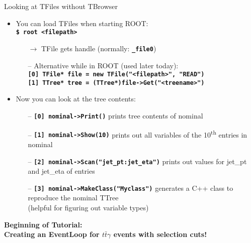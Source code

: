 \documentclass[10pt, aspectratio=169]{beamer}
\begin{document}
\begin{frame}{Looking at TFiles without TBrowser}
  \begin{itemize}
    \item
      You can load TFiles when starting ROOT: \\ \textbf{\texttt{\$ root <filepath>}}
    \begin{itemize}
      \item[$\rightarrow$] TFile gets handle (normally: \textbf{\texttt{\_file0}})
      \item[--] Alternative while in ROOT (used later today): \\ \textbf{\texttt{[0] TFile* file = new TFile("<filepath>", "READ")}} \\ \textbf{\texttt{[1] TTree* tree = (TTree*)file->Get("<treename>")}}
      
    \end{itemize}
    \item
      Now you can look at the tree contents:
    \begin{itemize}
      \item[--] \textbf{\texttt{[0] nominal->Print()}} prints tree contents of nominal
      \item[--] \textbf{\texttt{[1] nominal->Show(10)}} prints out all variables of the 10\textsuperscript{th} entries in nominal
      \item[--] \textbf{\texttt{[2] nominal->Scan("jet\_pt:jet\_eta")}} prints out values for jet\_pt and jet\_eta of entries
      \item[--] \textbf{\texttt{[3] nominal->MakeClass("Myclass")}} generates a C++ class to reproduce the nominal TTree \\ (helpful for figuring out variable types)
    \end{itemize}
  \end{itemize}
\end{frame}

\begin{frame}

  \begin{center}
  \ugoeAddLogo
  \Large\bfseries Beginning of Tutorial: \\
  \large Creating an EventLoop for $t\bar{t}\gamma$ events with selection cuts!
  \end{center}
\end{frame}
\end{document}
